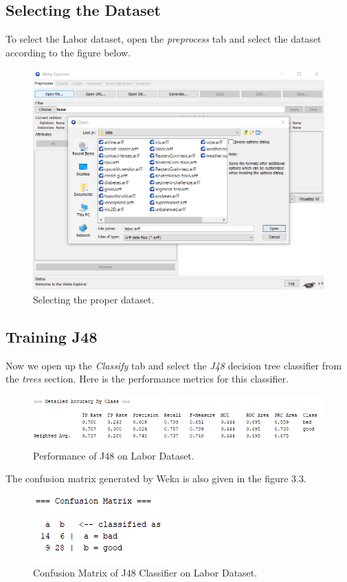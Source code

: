 \documentclass[12pt]{article}
\numberwithin{equation}{section}
\numberwithin{table}{section}
\numberwithin{figure}{section}
\begin{document}
\subsection{Selecting the Dataset}
To select the Labor dataset, open the \textit{preprocess} tab and select the dataset according to the figure below.
\begin{figure}[!h]
	\centering
	\includegraphics[scale=0.6]{2_1.png}
	\caption{Selecting the proper dataset.}
	\label{fig:PropProf}
\end{figure}

\subsection{Training J48}
Now we open up the \textit{Classify} tab and select the \textit{J48} decision tree classifier from the \textit{trees} section. Here is the performance metrics for this classifier.
\begin{figure}[!h]
	\centering
	\includegraphics[scale=1]{2_2.png}
	\caption{Performance of J48 on Labor Dataset.}
	\label{fig:PropProf}
\end{figure}
The confusion matrix generated by Weka is also given in the figure 3.3.
\begin{figure}[!h]
	\centering
	\includegraphics[scale=1]{2_3.png}
	\caption{Confusion Matrix of J48 Classifier on Labor Dataset.}
	\label{fig:PropProf}
\end{figure}
\end{document}
